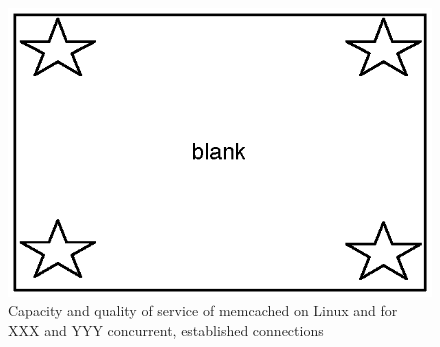 \begin{figure}
\begin{centering}
\includegraphics{figs/blank.eps}
\caption{Capacity and quality of service of memcached on Linux and \ix for XXX and YYY concurrent, established connections}
\label{fig:mutilate}
\end{centering}
\end{figure}

